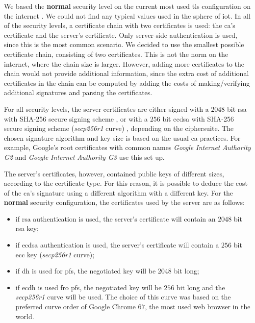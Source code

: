 \documentclass{llncs}
\begin{document}
We based the \textbf{normal} security level on the current most used \gls{tls} configuration on the internet \cite{QualysSS90:online}.
We could not find any typical values used in the sphere of \gls{iot}. In all of the security levels, a
certificate chain with two certificates is used: the \gls{ca}'s certificate
and the server's certificate. Only server-side authentication is used, since this is the most common scenario.
We decided to use the smallest possible certificate chain, consisting of two certificates. This is not the norm
on the internet, where the chain size is larger. However, adding more certificates to the chain would not provide additional
information, since the extra cost of additional certificates in the chain can be computed by adding the costs of
making/verifying additional signatures and parsing the certificates.

For all security levels, the server certificates are either
signed with a $2048$ bit \gls{rsa} with SHA-256 secure signing scheme \cite{RFC8017}, or with a $256$ bit \gls{ecdsa} with SHA-256 secure
signing scheme (\textit{secp256r1} curve) \cite{RFC6979},
depending on the ciphersuite.
The chosen signature algorithm and key size is based on the usual \gls{ca} practices. For example,
Google's root certificates with common names \textit{Google Internet Authority G2} and \textit{Google Internet Authority G3}
use this set up\cite{GoogleIn11:online}.

The server's certificates, however, contained public keys of different sizes, according to the certificate type.
For this reason, it is possible to deduce the cost of the \gls{ca}'s signature using a different algorithm with a
different key. For the \textbf{normal} security configuration, the certificates used by the server are as follows:

\begin{itemize}
  \item if \gls{rsa} authentication is used, the server's certificate will contain an $2048$ bit \gls{rsa} key;
  \item if \gls{ecdsa} authentication is used, the server's certificate will contain a $256$ bit \gls{ecc} key (\textit{secp256r1} curve);
  \item if \gls{dh} is used for \gls{pfs}, the negotiated key will be $2048$ bit long;
  \item if \gls{ecdh} is used fro \gls{pfs}, the negotiated key will be $256$ bit long and the \textit{secp256r1}
  curve will be used. The choice of this curve was based on the preferred curve order of Google Chrome $67$, the most
  used web browser in the world\cite{BrowserS4:online}.
\end{itemize}
\end{document}
